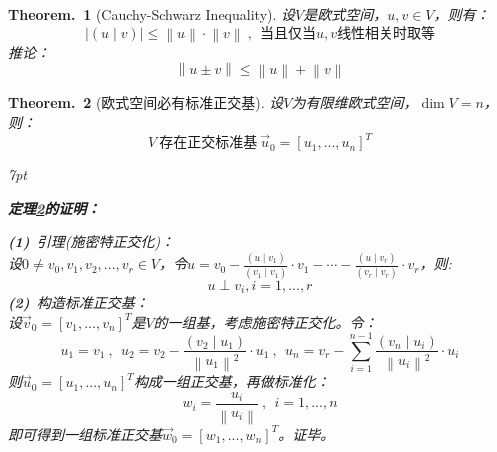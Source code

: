 \documentclass[zihao=-4,UTF8]{report}
\theoremstyle{mystyle} %
\newtheorem{theorem}{Theorem.\,}
\newenvironment{graybox}{%
\def\FrameCommand{%
\hspace{1pt}%
{\color{gray}\small \vrule width 2pt}%
{\color{graybox_color}\vrule width 4pt}%
\colorbox{graybox_color}%
}%
\MakeFramed{\advance\hsize-\width\FrameRestore}%
\noindent\hspace{-4.55pt}%
\begin{adjustwidth}{}{7pt}%
\vspace{2pt}\vspace{2pt}%
}
{%
\vspace{2pt}\end{adjustwidth}\endMakeFramed%
}
\begin{document}
\begin{theorem}[Cauchy-Schwarz Inequality]
    设$V$是欧式空间，$u,v \in V$，则有：
    \begin{equation*}
        |(u\mid v) | \le \left \| u \right \|\cdot\left \| v \right \| \ ,\ \ \text{当且仅当$u,v$线性相关时取等}
    \end{equation*}
推论：
\begin{equation*}
    \left \| u \pm v \right \| \le \left \| u \right \| + \left \| v \right \|
\end{equation*}
\end{theorem}
\begin{theorem}[欧式空间必有标准正交基]\label{有限维欧式空间必有标准正交基}
    设$V$为有限维欧式空间，$\dim V = n$，则：
    \begin{equation*}
        V\ \text{存在正交标准基}\ \vec{u}_0 = [u_1,...,u_n]^T
    \end{equation*}
\begin{graybox}
\textbf{定理\ref{有限维欧式空间必有标准正交基}的证明：}\par \noindent
\textbf{(1)}\ 引理(施密特正交化)：\\
设$0 \ne v_0,v_1,v_2,...,v_r \in V$，令$u = v_0 - \frac{(u\mid v_1)}{(v_1 \mid v_1)}\cdot v_1 - \cdots -  \frac{(u\mid v_{r})}{(v_{r} \mid v_{r})}\cdot v_{r}$，则:
\begin{equation*}
    u \perp v_i , i =1,...,r   
\end{equation*}
\textbf{(2)}\ 构造标准正交基：\\
设$\vec{v}_0 = [v_1,...,v_n]^T$是$V$的一组基，考虑施密特正交化。令：
\begin{equation*}
    u_1 = v_1\ ,\ \ u_2 = v_2 - \frac{(v_2\mid u_1)}{\left \| u_1 \right \|^2}\cdot u_1\ ,\ \ u_n = v_r -\sum_{i=1}^{n-1} \frac{(v_n\mid u_i)}{\left \| u_i \right \|^2}\cdot u_i
\end{equation*}
则$\vec{u}_0 = [u_1,...,u_n]^T$构成一组正交基，再做标准化：
\begin{equation*}
    w_i = \frac{u_i}{\left \| u_i \right \|}\ ,\ \ i = 1,...,n
\end{equation*}
即可得到一组标准正交基$\vec{w}_0 = [w_1,...,w_n]^T$。证毕。
\end{graybox}
\end{theorem}
\end{document}
